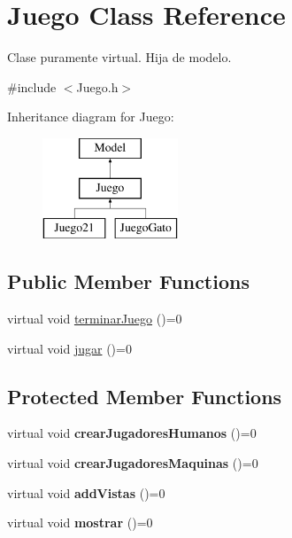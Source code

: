 \hypertarget{class_juego}{}\section{Juego Class Reference}
\label{class_juego}


Clase puramente virtual. Hija de modelo.  




{\ttfamily \#include $<$Juego.\+h$>$}

Inheritance diagram for Juego\+:\begin{figure}[H]
\begin{center}
\leavevmode
\includegraphics[height=3.000000cm]{class_juego}
\end{center}
\end{figure}
\subsection*{Public Member Functions}
\begin{DoxyCompactItemize}
\item 
virtual void \hyperlink{class_juego_a92053738ca2f7375ef42211a72e59f5c}{terminar\+Juego} ()=0
\item 
virtual void \hyperlink{class_juego_aa2906c1f0ae10f2f34cd49f52bdd14ed}{jugar} ()=0
\end{DoxyCompactItemize}
\subsection*{Protected Member Functions}
\begin{DoxyCompactItemize}
\item 
virtual void {\bfseries crear\+Jugadores\+Humanos} ()=0\hypertarget{class_juego_a3edaee94e248a4f107c825965e816627}{}\label{class_juego_a3edaee94e248a4f107c825965e816627}

\item 
virtual void {\bfseries crear\+Jugadores\+Maquinas} ()=0\hypertarget{class_juego_ad0ae19cdb246e387739ccc1fe16f7c62}{}\label{class_juego_ad0ae19cdb246e387739ccc1fe16f7c62}

\item 
virtual void {\bfseries add\+Vistas} ()=0\hypertarget{class_juego_aad6ae20d1dc71102101e16e774f4e78b}{}\label{class_juego_aad6ae20d1dc71102101e16e774f4e78b}

\item 
virtual void {\bfseries mostrar} ()=0\hypertarget{class_juego_acb3cc272016f24b02813485fd4d6680e}{}\label{class_juego_acb3cc272016f24b02813485fd4d6680e}

\end{DoxyCompactItemize}
